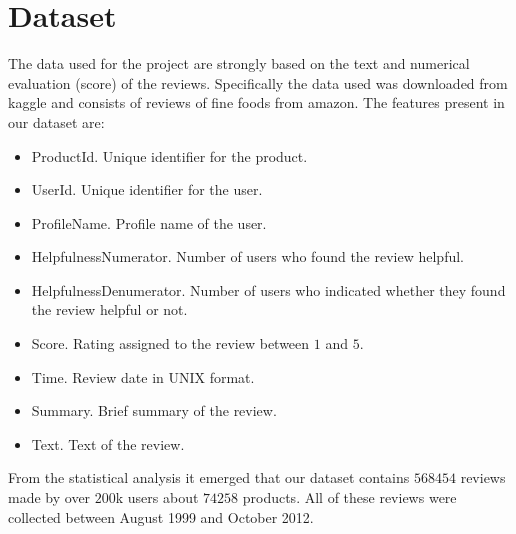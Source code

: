 \documentclass[11pt]{article}
\begin{document}
\section{Dataset}
The data used for the project are strongly based on the text and numerical evaluation (score) of the reviews. Specifically the data used was downloaded from kaggle \cite{kaggleDataset} and consists of reviews of fine foods from amazon. The features present in our dataset are:
\begin{itemize}
    \item ProductId. Unique identifier for the product.
    \item UserId. Unique identifier for the user.
    \item ProfileName. Profile name of the user.
    \item HelpfulnessNumerator. Number of users who found the review helpful.
    \item HelpfulnessDenumerator. Number of users who indicated whether they found the review helpful or not.
    \item Score. Rating assigned to the review between $1$ and $5$.
    \item Time. Review date in UNIX format.
    \item Summary. Brief summary of the review.
    \item Text. Text of the review.
\end{itemize}
From the statistical analysis it emerged that our dataset contains $568454$ reviews made by over $200$k users about $74258$ products. All of these reviews were collected between August 1999 and October 2012.\\
\end{document}
